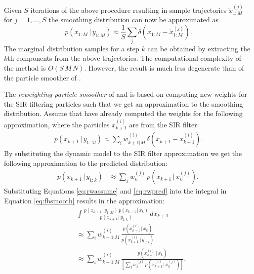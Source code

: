 \documentclass[twocolumn]{autart}    %
\begin{document}
%
Given $S$ iterations of the above procedure resulting in sample
trajectories $\tilde{x}_{1:M}^{(j)}$ for $j=1,\ldots,S$ the
smoothing distribution can now be approximated as
%
\begin{equation}
     p(x_{1:M}\,|\,y_{1:M}) \approx
      \frac{1}{S} \sum_j \delta(x_{1:M} - \tilde{x}_{1:M}^{(j)}).
\end{equation}
%
The marginal distribution samples for a step $k$ can be obtained by
extracting the $k$th components from the above trajectories. The
computational complexity of the method is $O(S \, M \, N)$. However,
the result is much less degenerate than of the particle smoother of
\cite{Kitagawa:1996}.

The {\em reweighting particle smoother} of \cite{Hurzeler+Kunsch:1998} and
\cite{Doucet+Godsill+Andrieu:2000} is based on computing new weights
for the SIR filtering particles such that we get an approximation to
the smoothing distribution. Assume that have already computed the
weights for the following approximation, where the particles
$x_{k+1}^{(i)}$ are from the SIR filter:
%
\begin{equation}
\begin{split}
   p(x_{k+1}\,|\,y_{1:M}) 
   \approx
   \sum_i w^{(i)}_{k+1|M} \, \delta(x_{k+1} - x_{k+1}^{(i)}).
\end{split}
\label{eq:rwassume}
\end{equation}
%
By substituting the dynamic model to the SIR filter approximation
we get the following approximation to the predicted distribution:
%
\begin{equation}
\begin{split}
  p(x_{k+1}\,|\,y_{1:k})
  &\approx \sum_j w_k^{(j)} \, p(x_{k+1}\,|\,x_{k}^{(j)}),
\end{split}
\label{eq:rwpred}
\end{equation}
%
Substituting Equations \eqref{eq:rwassume} and \eqref{eq:rwpred} into
the integral in Equation \eqref{eq:fbsmooth} results in the
approximation:
%
\begin{equation}
\begin{split}
  &\int \frac{p(x_{k+1} \,|\, y_{1:M}) \, p(x_{k+1}\,|\,x_{k})}
           {p(x_{k+1}\,|\,y_{1:k})} \, dx_{k+1} \\
  &\approx
  \sum_i w^{(i)}_{k+1|M} \,
  \frac{p(x_{k+1}^{(i)}\,|\,x_{k})}{p(x_{k+1}^{(i)}\,|\,y_{1:k})} \\
  &\approx
  \sum_i w^{(i)}_{k+1|M} \,
  \frac{p(x_{k+1}^{(i)}\,|\,x_{k})}
   {\left[ \sum_j w_k^{(j)} \, p(x_{k+1}^{(i)}\,|\,x_{k}^{(j)}) \right]}.
\end{split}
\end{equation}
\end{document}
